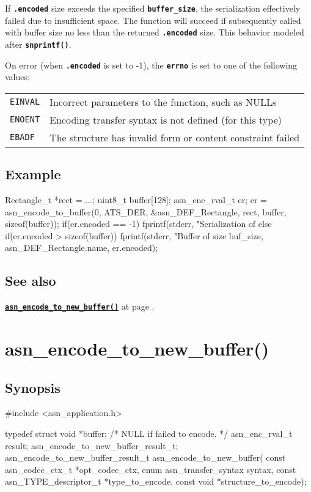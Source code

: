 \documentclass[english,oneside,12pt]{book}
\newcommand{\apisection}[2]{\clearpage\section{\label{#1}#2}}
\newcommand{\api}[2]{\hyperref[#1]{\code{#2}}}
\newcommand{\seealso}[2]{\api{#1}{#2} at page \pageref{#1}}
\newcommand{\code}[1]{\texttt{\textbf{\lstinline{#1}}}}
\begin{document}
If \code{.encoded} size exceeds the specified \code{buffer_size},
the serialization effectively failed due to insufficient space. The function
will succeed if subsequently called with buffer size no less than the returned
\code{.encoded} size. This behavior modeled after \code{snprintf()}.

On error (when \code{.encoded} is set to -1),
the \code{errno} is set to one of the following values:

\begin{tabular}[h!]{ll}
\texttt{EINVAL} & Incorrect parameters to the function, such as NULLs \\
\texttt{ENOENT} & Encoding transfer syntax is not defined (for this type) \\
\texttt{EBADF} & The structure has invalid form or content constraint failed
\end{tabular}

\subsection*{Example}
\begin{example}
Rectangle_t *rect = ...;
uint8_t buffer[128];
asn_enc_rval_t er;
er = asn_encode_to_buffer(0, ATS_DER, &asn_DEF_Rectangle, rect, buffer, sizeof(buffer));
if(er.encoded == -1) {
   fprintf(stderr, "Serialization of %
} else if(er.encoded > sizeof(buffer)) {
   fprintf(stderr, "Buffer of size %
       buf_size, asn_DEF_Rectangle.name, er.encoded);
}
\end{example}

\subsection*{See also}
\seealso{sec:asn_encode_to_new_buffer}{asn_encode_to_new_buffer()}.

\apisection{sec:asn_encode_to_new_buffer}{asn\_encode\_to\_new\_buffer()}

\subsection*{Synopsis}

\begin{signature}
#include <asn_application.h>

typedef struct {
    void *buffer;   /* NULL if failed to encode. */
    asn_enc_rval_t result;
} asn_encode_to_new_buffer_result_t;
asn_encode_to_new_buffer_result_t asn_encode_to_new_buffer(
    const asn_codec_ctx_t *opt_codec_ctx,
    enum asn_transfer_syntax syntax,
    const asn_TYPE_descriptor_t *type_to_encode,
    const void *structure_to_encode);
\end{signature}
\end{document}
